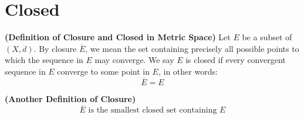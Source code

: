\documentclass{report}
\begin{document}
\section{Closed}
\begin{definition}
\label{3.2.1}
\textbf{(Definition of Closure and Closed in Metric Space)} Let $E$ be a subset of  $(X,d)$. By closure $\overline{E}$, we mean the set containing precisely all possible points to which the sequence in $E$ may converge. We say $E$ is closed if every convergent sequence in $E$ converge to some point in $E$, in other words:
 \begin{equation}
\overline{E}=E
\end{equation}
\end{definition}
\begin{theorem}
\label{3.2.2}
\textbf{(Another Definition of Closure)}
\begin{equation}
\overline{E}\text{ is the smallest closed set containing }E
\end{equation}
\end{theorem}
\end{document}
